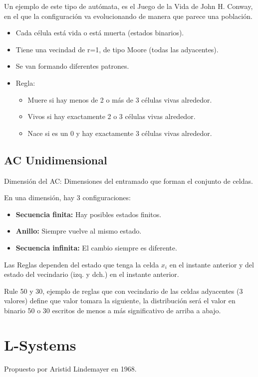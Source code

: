 Un ejemplo de este tipo de autómata, es el Juego de la Vida de John H. Conway, en el que la configuración va evolucionando de manera que parece una población.
\begin{itemize}
	\item Cada célula está vida o está muerta (estados binarios).
	\item Tiene una vecindad de r=1, de tipo Moore (todas las adyacentes).
	\item Se van formando diferentes patrones.
	\item Regla:
	      \begin{itemize}
		      \item Muere si hay menos de 2 o más de 3 células vivas alrededor.
		      \item Vivos si hay exactamente 2 o 3 células vivas alrededor.
		      \item Nace si es un 0 y hay exactamente 3 células vivas alrededor.
	      \end{itemize}
\end{itemize}

\subsection{AC Unidimensional}
Dimensión del AC: Dimensiones del entramado que forman el conjunto de celdas.

En una dimensión, hay 3 configuraciones:
\begin{itemize}
	\item \textbf{Secuencia finita:} Hay posibles estados finitos.
	\item \textbf{Anillo:} Siempre vuelve al mismo estado.
	\item \textbf{Secuencia infinita:} El cambio siempre es diferente.
\end{itemize}

Las Reglas dependen del estado que tenga la celda $x_i$ en el instante anterior y del estado del vecindario (izq. y dch.) en el instante anterior.

Rule 50 y 30, ejemplo de reglas que con vecindario de las celdas adyacentes (3 valores) define que valor tomara la siguiente, la distribución será el valor en binario 50 o 30 escritos de menos a más significativo de arriba a abajo.

\section{L-Systems}
Propuesto por Aristid Lindemayer en 1968.

